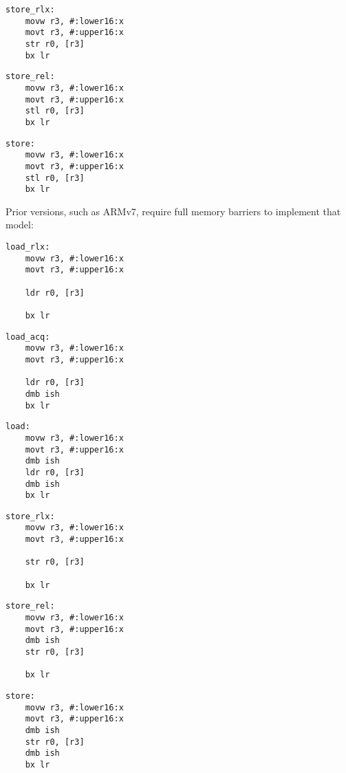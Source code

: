 \begin{multicols}{3}
    \begin{lstlisting}[style=arm,xleftmargin=0px,xrightmargin=0px]
store_rlx:
    movw r3, #:lower16:x
    movt r3, #:upper16:x
    str r0, [r3]
    bx lr
    \end{lstlisting}
    \columnbreak
    \begin{lstlisting}[style=arm,xleftmargin=0px,xrightmargin=0px]
store_rel:
    movw r3, #:lower16:x
    movt r3, #:upper16:x
    stl r0, [r3]
    bx lr
    \end{lstlisting}
    \columnbreak
    \begin{lstlisting}[style=arm,xleftmargin=0px,xrightmargin=0px]
store:
    movw r3, #:lower16:x
    movt r3, #:upper16:x
    stl r0, [r3]
    bx lr
    \end{lstlisting}
\end{multicols}

Prior versions, such as ARMv7, require full memory barriers to implement that
model:

\begin{multicols}{3}
    \begin{lstlisting}[style=arm,xleftmargin=0px,xrightmargin=0px]
load_rlx:
    movw r3, #:lower16:x
    movt r3, #:upper16:x

    ldr r0, [r3]

    bx lr
    \end{lstlisting}
    \columnbreak
    \begin{lstlisting}[style=arm,xleftmargin=0px,xrightmargin=0px]
load_acq:
    movw r3, #:lower16:x
    movt r3, #:upper16:x

    ldr r0, [r3]
    dmb ish
    bx lr
    \end{lstlisting}
    \columnbreak
    \begin{lstlisting}[style=arm,xleftmargin=0px,xrightmargin=0px]
load:
    movw r3, #:lower16:x
    movt r3, #:upper16:x
    dmb ish
    ldr r0, [r3]
    dmb ish
    bx lr
    \end{lstlisting}
\end{multicols}

\begin{multicols}{3}
    \begin{lstlisting}[style=arm,xleftmargin=0px,xrightmargin=0px]
store_rlx:
    movw r3, #:lower16:x
    movt r3, #:upper16:x

    str r0, [r3]

    bx lr
    \end{lstlisting}
    \columnbreak
    \begin{lstlisting}[style=arm,xleftmargin=0px,xrightmargin=0px]
store_rel:
    movw r3, #:lower16:x
    movt r3, #:upper16:x
    dmb ish
    str r0, [r3]

    bx lr
    \end{lstlisting}
    \columnbreak
    \begin{lstlisting}[style=arm,xleftmargin=0px,xrightmargin=0px]
store:
    movw r3, #:lower16:x
    movt r3, #:upper16:x
    dmb ish
    str r0, [r3]
    dmb ish
    bx lr
    \end{lstlisting}
\end{multicols}

